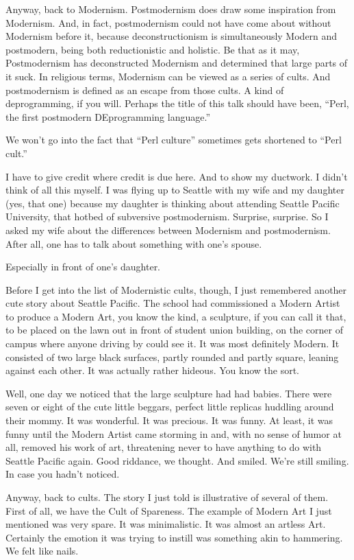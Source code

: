 \documentclass[10pt,letterpaper]{article}
\begin{document}
Anyway, back to Modernism. Postmodernism does draw some inspiration from
Modernism. And, in fact, postmodernism could not have come about without
Modernism before it, because deconstructionism is simultaneously Modern and
postmodern, being both reductionistic and holistic. Be that as it may,
Postmodernism has deconstructed Modernism and determined that large parts of
it suck. In religious terms, Modernism can be viewed as a series of cults.
And postmodernism is defined as an escape from those cults. A kind of
deprogramming, if you will. Perhaps the title of this talk should have been,
``Perl, the first postmodern DEprogramming language.''

We won't go into the fact that ``Perl culture'' sometimes gets shortened to
``Perl cult.''

I have to give credit where credit is due here. And to show my ductwork. I
didn't think of all this myself. I was flying up to Seattle with my wife and
my daughter (yes, that one) because my daughter is thinking about attending
Seattle Pacific University, that hotbed of subversive postmodernism.
Surprise, surprise. So I asked my wife about the differences between
Modernism and postmodernism. After all, one has to talk about something with
one's spouse.

Especially in front of one's daughter.

Before I get into the list of Modernistic cults, though, I just remembered
another cute story about Seattle Pacific. The school had commissioned a
Modern Artist to produce a Modern Art, you know the kind, a sculpture, if you
can call it that, to be placed on the lawn out in front of student union
building, on the corner of campus where anyone driving by could see it. It
was most definitely Modern. It consisted of two large black surfaces, partly
rounded and partly square, leaning against each other. It was actually rather
hideous. You know the sort.

Well, one day we noticed that the large sculpture had had babies. There were
seven or eight of the cute little beggars, perfect little replicas huddling
around their mommy. It was wonderful. It was precious. It was funny. At
least, it was funny until the Modern Artist came storming in and, with no
sense of humor at all, removed his work of art, threatening never to have
anything to do with Seattle Pacific again. Good riddance, we thought. And
smiled. We're still smiling. In case you hadn't noticed.

Anyway, back to cults. The story I just told is illustrative of several of
them. First of all, we have the Cult of Spareness. The example of Modern Art
I just mentioned was very spare. It was minimalistic. It was almost an
artless Art. Certainly the emotion it was trying to instill was something
akin to hammering. We felt like nails.
\end{document}
